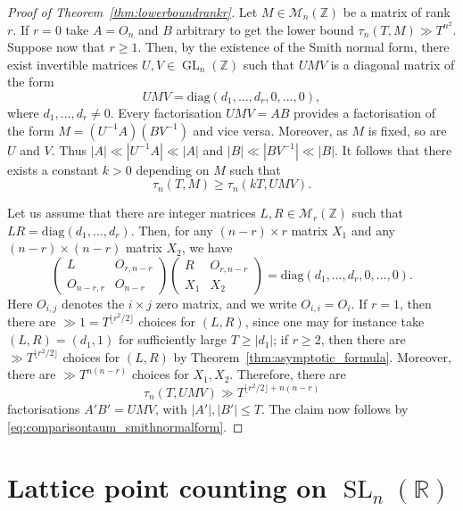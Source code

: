 \documentclass[11pt,reqno]{amsart}
\theoremstyle{definition}
\theoremstyle{remark}
\newcommand{\GL}{\operatorname{GL}}
\newcommand{\SL}{\operatorname{SL}}
\numberwithin{equation}{section}
\numberwithin{thm}{section}
\numberwithin{table}{section}
\def \R {{\mathbb R}}
\def \Z {{\mathbb Z}}
\begin{document}
\begin{proof}[Proof of Theorem~\ref{thm:lowerboundrankr}]
Let $M \in \mathcal{M}_n(\Z)$ be a matrix of rank $r$. 
If $r=0$ take $A=O_n$ and $B$ arbitrary to get the lower bound 
$\tau_n(T,M)\gg T^{n^2}$. 
Suppose now that $r\geq 1$.
Then, by the existence of the Smith normal form, there exist invertible matrices $U,V \in \GL_n(\Z)$ such that $UMV$ is a diagonal matrix of the form
\[
    U M V = \mathrm{diag}(d_1, \ldots, d_r, 0, \ldots, 0),
\]
where $d_1, \ldots, d_r \neq 0$. Every factorisation $UMV = AB$ provides a factorisation of the form $M = (U^{-1}A)(BV^{-1})$ and vice versa. Moreover, as $M$ is fixed, so are $U$ and $V$. 
Thus  $|A| \ll |U^{-1}A| \ll |A|$ and $|B| \ll |BV^{-1}| \ll |B|$. It follows that there exists a constant $k>0$ depending on $M$ such that 
\begin{equation}\label{eq:comparisontaum_smithnormalform}
       \tau_n(T,M) \ge \tau_n(kT,UMV).
\end{equation}

Let us assume that there are integer matrices $L, R\in \mathcal{M}_r(\Z)$ such that $LR = \mathrm{diag}(d_1,\ldots,d_r)$. Then, for any $(n-r)\times r$ matrix $X_1$ and any $(n-r)\times (n-r)$ matrix $X_2$, we have 
\[
    \begin{pmatrix}
        L & O_{r,n-r} \\
        O_{n-r,r} & O_{n-r}
    \end{pmatrix}
    \begin{pmatrix}
        R & O_{r,n-r} \\
        X_1 & X_2
    \end{pmatrix} 
    = \mathrm{diag}(d_1,\ldots,d_r,0,\ldots,0).
\]
Here $O_{i,j}$ denotes the $i\times j$ zero matrix, and we write $O_{i,i}=O_i$.
If $r=1$, then there are $\gg 1 = T^{\lfloor r^2 /2 \rfloor}$ choices for $(L,R)$, since one may for instance take $(L,R) = (d_1,1)$ for sufficiently large $T \ge |d_1|$; if $r\ge 2$, then there are $\gg T^{\lfloor r^2/2 \rfloor}$ choices for $(L,R)$ by Theorem~\ref{thm:asymptotic_formula}. Moreover, there are $\gg T^{n(n-r)}$ choices for $X_1, X_2$. 
Therefore, there are 
\[
   \tau_{n}(T,UMV) \gg T^{\lfloor r^2/2 \rfloor + n(n-r)}
\]
 factorisations $A'B' = UMV$, with $|A'|, |B'| \le T$.
The claim now follows by \eqref{eq:comparisontaum_smithnormalform}.
\end{proof}


\section{Lattice point counting on
\texorpdfstring{$\SL_n(\R)$}{SL\_n(R)}}\label{section:latticepts}
\end{document}
